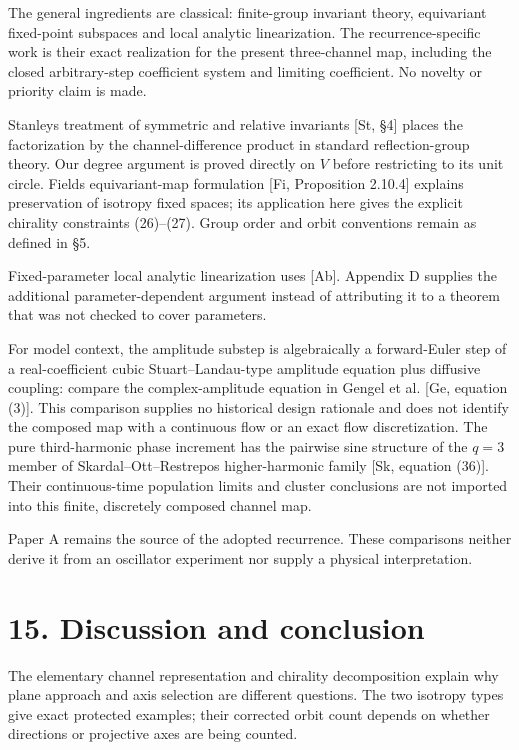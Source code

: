 \documentclass[
  11pt,
  a4paper,
]{article}
\begin{document}
The general ingredients are classical: finite-group invariant theory, equivariant fixed-point subspaces and local analytic linearization. The recurrence-specific work is their exact realization for the present three-channel map, including the closed arbitrary-step coefficient system and limiting coefficient. No novelty or priority claim is made.

Stanley\textquotesingle s treatment of symmetric and relative invariants {[}St, §4{]} places the factorization by the channel-difference product in standard reflection-group theory. Our degree argument is proved directly on \(V\) before restricting to its unit circle. Field\textquotesingle s equivariant-map formulation {[}Fi, Proposition 2.10.4{]} explains preservation of isotropy fixed spaces; its application here gives the explicit chirality constraints (26)--(27). Group order and orbit conventions remain as defined in §5.

Fixed-parameter local analytic linearization uses {[}Ab{]}. Appendix D supplies the additional parameter-dependent argument instead of attributing it to a theorem that was not checked to cover parameters.

For model context, the amplitude substep is algebraically a forward-Euler step of a real-coefficient cubic Stuart--Landau-type amplitude equation plus diffusive coupling: compare the complex-amplitude equation in Gengel et al. {[}Ge, equation (3){]}. This comparison supplies no historical design rationale and does not identify the composed map with a continuous flow or an exact flow discretization. The pure third-harmonic phase increment has the pairwise sine structure of the \(q=3\) member of Skardal--Ott--Restrepo\textquotesingle s higher-harmonic family {[}Sk, equation (36){]}. Their continuous-time population limits and cluster conclusions are not imported into this finite, discretely composed channel map.

Paper A remains the source of the adopted recurrence. These comparisons neither derive it from an oscillator experiment nor supply a physical interpretation.

\section{15. Discussion and conclusion}\label{discussion-and-conclusion}

The elementary channel representation and chirality decomposition explain why plane approach and axis selection are different questions. The two isotropy types give exact protected examples; their corrected orbit count depends on whether directions or projective axes are being counted.
\end{document}
